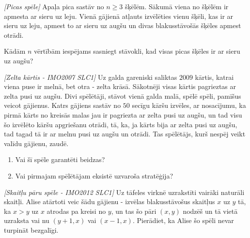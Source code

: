 \begin{problem}
\textit{[Picas spēle]}
Apaļa pica sastāv no  $n\ge3$ šķēlēm. Sākumā viena no šķēlēm ir apmesta ar sieru uz leju. Vienā gājienā atļauts izvēlēties vienu šķēli, kas ir ar sieru uz leju, apmest to ar sieru uz augšu un divas blakusstāvošās šķēles apmest otrādi.

Kādām $n$ vērtībām iespējams sasniegt stāvokli, kad visas picas šķēles ir ar sieru uz augšu?
\end{problem}
%

\begin{problem}
\textit{[Zelta kārtis - IMO2007 SLC1]}
Uz galda gareniski saliktas $2009$ kārtis, katrai viena puse ir melnā, bet otra - zelta krāsā. Sākotnēji visas kārtis pagrieztas ar zelta pusi uz augšu. Divi spēlētāji, stāvot vienā galda malā, spēlē spēli, pamīšus veicot gājienus. Katrs gājiens sastāv no $50$ secīgu kāršu izvēles, ar nosacījumu, ka pirmā kārts no kreisās malas jau ir pagriezta ar zelta pusi uz augšu, un tad visu šo izvēlēto kāršu apgriešanu otrādi, tā, ka, ja kārts bija ar zelta pusi uz augšu, tad tagad tā ir ar melnu pusi uz augšu un otrādi. Tas spēlētājs, kurš nespēj veikt valīdu gājienu, zaudē.
\begin{enumerate}
\item Vai šī spēle garantēti beidzas?
\item Vai pirmajam spēlētājam eksistē uzvaroša stratēģija?
\end{enumerate}
\end{problem}
%

\begin{problem}
\textit{[Skaitļu pāru spēle - IMO2012 SLC1]}
Uz tāfeles virknē uzrakstīti vairāki naturāli skaitļi. Alise atārtoti veic šādu gājienu - izvēlas blakusstāvošus skaitļus $x$ uz $y$ tā, ka $x > y$ uz $x$ atrodas pa kreisi no $y$, un tas šo pāri $(x, y)$ nodzēš un tā vietā uzraksta vai nu $(y + 1, x)$ vai $(x − 1, x)$. Pierādiet, ka Alise šo spēli nevar turpināt bezgalīgi.
\end{problem}
%


